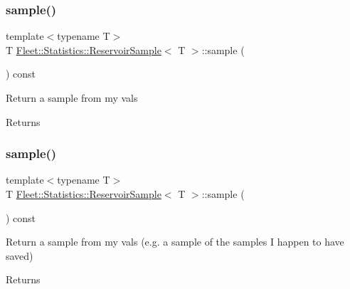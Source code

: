 \subsubsection{\texorpdfstring{sample()}{sample()}\hspace{0.1cm}{\footnotesize\ttfamily [1/2]}}
{\footnotesize\ttfamily template$<$typename T$>$ \\
T \hyperlink{class_fleet_1_1_statistics_1_1_reservoir_sample}{Fleet\+::\+Statistics\+::\+Reservoir\+Sample}$<$ T $>$\+::sample (\begin{DoxyParamCaption}{ }\end{DoxyParamCaption}) const\hspace{0.3cm}{\ttfamily [inline]}}

Return a sample from my vals \begin{DoxyReturn}{Returns}

\end{DoxyReturn}
\mbox{\label{class_fleet_1_1_statistics_1_1_reservoir_sample_a1b66a8f27512ebd6a48370621a43db87}} 
\subsubsection{\texorpdfstring{sample()}{sample()}\hspace{0.1cm}{\footnotesize\ttfamily [2/2]}}
{\footnotesize\ttfamily template$<$typename T$>$ \\
T \hyperlink{class_fleet_1_1_statistics_1_1_reservoir_sample}{Fleet\+::\+Statistics\+::\+Reservoir\+Sample}$<$ T $>$\+::sample (\begin{DoxyParamCaption}{ }\end{DoxyParamCaption}) const\hspace{0.3cm}{\ttfamily [inline]}}

Return a sample from my vals (e.\+g. a sample of the samples I happen to have saved) \begin{DoxyReturn}{Returns}

\end{DoxyReturn}
\mbox{\label{class_fleet_1_1_statistics_1_1_reservoir_sample_adabe7f40c91657950a67df7d20ace543}} 
